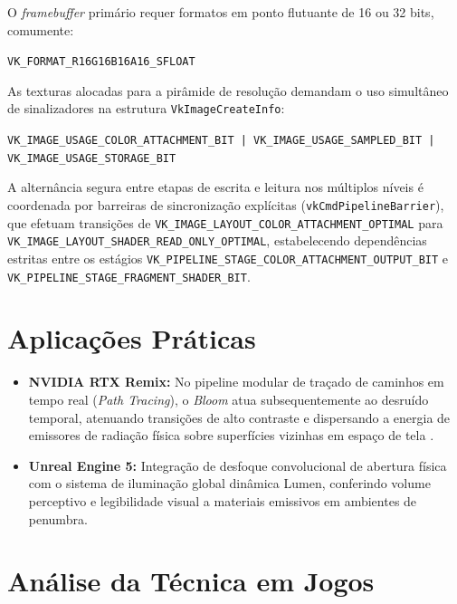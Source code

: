 \documentclass[12pt,a4paper]{article}
\begin{document}
O \textit{framebuffer} primário requer formatos em ponto flutuante de 16 ou 32 bits, comumente:
\begin{center}
    \texttt{VK\_FORMAT\_R16G16B16A16\_SFLOAT}
\end{center}
As texturas alocadas para a pirâmide de resolução demandam o uso simultâneo de sinalizadores na estrutura \texttt{VkImageCreateInfo}:
\begin{center}
    \texttt{VK\_IMAGE\_USAGE\_COLOR\_ATTACHMENT\_BIT | VK\_IMAGE\_USAGE\_SAMPLED\_BIT | VK\_IMAGE\_USAGE\_STORAGE\_BIT}
\end{center}
\begin{sloppypar}
\noindent A alternância segura entre etapas de escrita e leitura nos múltiplos níveis é coordenada por barreiras de sincronização explícitas (\texttt{vkCmdPipelineBarrier}), que efetuam transições de \texttt{VK\_\allowbreak IMAGE\_\allowbreak LAYOUT\_\allowbreak COLOR\_\allowbreak ATTACHMENT\_\allowbreak OPTIMAL} para \texttt{VK\_\allowbreak IMAGE\_\allowbreak LAYOUT\_\allowbreak SHADER\_\allowbreak READ\_\allowbreak ONLY\_\allowbreak OPTIMAL}, estabelecendo dependências estritas entre os estágios \texttt{VK\_\allowbreak PIPELINE\_\allowbreak STAGE\_\allowbreak COLOR\_\allowbreak ATTACHMENT\_\allowbreak OUTPUT\_\allowbreak BIT} e \texttt{VK\_\allowbreak PIPELINE\_\allowbreak STAGE\_\allowbreak FRAGMENT\_\allowbreak SHADER\_\allowbreak BIT}.
\end{sloppypar}

\section{Aplicações Práticas}
\begin{itemize}
    \item \textbf{NVIDIA RTX Remix:} No pipeline modular de traçado de caminhos em tempo real (\textit{Path Tracing}), o \textit{Bloom} atua subsequentemente ao desruído temporal, atenuando transições de alto contraste e dispersando a energia de emissores de radiação física sobre superfícies vizinhas em espaço de tela \cite{ignatenko2008glare}.
    \item \textbf{Unreal Engine 5:} Integração de desfoque convolucional de abertura física com o sistema de iluminação global dinâmica Lumen, conferindo volume perceptivo e legibilidade visual a materiais emissivos em ambientes de penumbra.
\end{itemize}

\section{Análise da Técnica em Jogos}
\end{document}
